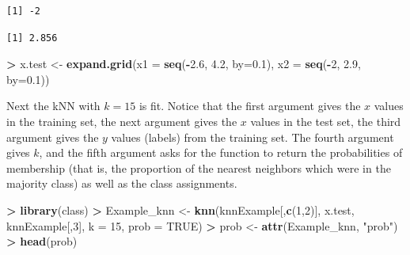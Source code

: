 \documentclass[
]{krantz}
\makeatletter
\newenvironment{Shaded}{\begin{snugshade}}{\end{snugshade}}
\newcommand{\DataTypeTok}[1]{\textcolor[rgb]{0.27,0.27,0.27}{#1}}
\newcommand{\DecValTok}[1]{\textcolor[rgb]{0.06,0.06,0.06}{#1}}
\newcommand{\FloatTok}[1]{\textcolor[rgb]{0.06,0.06,0.06}{#1}}
\newcommand{\KeywordTok}[1]{\textcolor[rgb]{0.27,0.27,0.27}{\textbf{#1}}}
\newcommand{\NormalTok}[1]{#1}
\newcommand{\OperatorTok}[1]{\textcolor[rgb]{0.43,0.43,0.43}{\textbf{#1}}}
\newcommand{\OtherTok}[1]{\textcolor[rgb]{0.37,0.37,0.37}{#1}}
\newcommand{\StringTok}[1]{\textcolor[rgb]{0.5,0.5,0.5}{#1}}
\newenvironment{kframe}{%
\medskip{}
\setlength{\fboxsep}{.8em}
 \def\at@end@of@kframe{}%
 \ifinner\ifhmode%
  \def\at@end@of@kframe{\end{minipage}}%
  \begin{minipage}{\columnwidth}%
 \fi\fi%
 \def\FrameCommand##1{\hskip\@totalleftmargin \hskip-\fboxsep
 \colorbox{shadecolor}{##1}\hskip-\fboxsep
     \hskip-\linewidth \hskip-\@totalleftmargin \hskip\columnwidth}%
 \MakeFramed {\advance\hsize-\width
   \@totalleftmargin\z@ \linewidth\hsize
   \@setminipage}}%
 {\par\unskip\endMakeFramed%
 \at@end@of@kframe}
\renewenvironment{Shaded}{\begin{kframe}}{\end{kframe}}
\makeatother
\begin{document}
\begin{verbatim}
[1] -2
\end{verbatim}

\begin{Shaded}
\end{Shaded}

\begin{verbatim}
[1] 2.856
\end{verbatim}

\begin{Shaded}
\begin{Highlighting}[]
\OperatorTok{\textgreater{}}\StringTok{ }\NormalTok{x.test \textless{}{-}}\StringTok{ }\KeywordTok{expand.grid}\NormalTok{(}\DataTypeTok{x1 =} \KeywordTok{seq}\NormalTok{(}\OperatorTok{{-}}\FloatTok{2.6}\NormalTok{, }\FloatTok{4.2}\NormalTok{, }\DataTypeTok{by=}\FloatTok{0.1}\NormalTok{), }\DataTypeTok{x2 =} \KeywordTok{seq}\NormalTok{(}\OperatorTok{{-}}\DecValTok{2}\NormalTok{, }\FloatTok{2.9}\NormalTok{, }\DataTypeTok{by=}\FloatTok{0.1}\NormalTok{))}
\end{Highlighting}
\end{Shaded}

Next the kNN with \(k=15\) is fit. Notice that the first argument gives the \(x\) values in the training set, the next argument gives the \(x\) values in the test set, the third argument gives the \(y\) values (labels) from the training set. The fourth argument gives \(k\), and the fifth argument asks for the function to return the probabilities of membership (that is, the proportion of the nearest neighbors which were in the majority class) as well as the class assignments.

\begin{Shaded}
\begin{Highlighting}[]
\OperatorTok{\textgreater{}}\StringTok{ }\KeywordTok{library}\NormalTok{(class)}
\OperatorTok{\textgreater{}}\StringTok{ }\NormalTok{Example\_knn \textless{}{-}}\StringTok{ }\KeywordTok{knn}\NormalTok{(knnExample[,}\KeywordTok{c}\NormalTok{(}\DecValTok{1}\NormalTok{,}\DecValTok{2}\NormalTok{)], x.test, knnExample[,}\DecValTok{3}\NormalTok{], }\DataTypeTok{k =} \DecValTok{15}\NormalTok{, }\DataTypeTok{prob =} \OtherTok{TRUE}\NormalTok{)}
\OperatorTok{\textgreater{}}\StringTok{ }\NormalTok{prob \textless{}{-}}\StringTok{ }\KeywordTok{attr}\NormalTok{(Example\_knn, }\StringTok{"prob"}\NormalTok{)}
\OperatorTok{\textgreater{}}\StringTok{ }\KeywordTok{head}\NormalTok{(prob)}
\end{Highlighting}
\end{Shaded}
\end{document}
